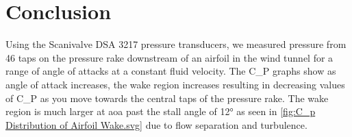 \chapter{Conclusion}
\label{cp:conclusion}
Using the Scanivalve DSA 3217 pressure transducers, we measured pressure from \num{46} taps on the pressure rake downstream of an airfoil in the wind tunnel for a range of angle of attacks at a constant fluid velocity. The \gls{C_P} graphs show as angle of attack increases, the wake region increases resulting in decreasing values of \gls{C_P} as you move towards the central taps of the pressure rake. The wake region is much larger at \acrshort{aoa} past the stall angle of \num{12}\unit{\degree} as seen in \autoref{fig:C_p Distribution of Airfoil Wake.svg} due to flow separation and turbulence.